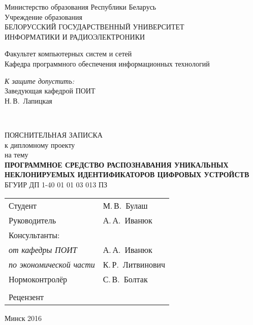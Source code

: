 \begin{titlepage}
  \begin{center}
    Министерство образования Республики Беларусь\\[1em]
    Учреждение образования\\
    БЕЛОРУССКИЙ ГОСУДАРСТВЕННЫЙ УНИВЕРСИТЕТ \\
    ИНФОРМАТИКИ И РАДИОЭЛЕКТРОНИКИ\\[1em]

    \begin{flushleft}
        Факультет компьютерных систем и сетей\\
        Кафедра программного обеспечения информационных технологий
    \end{flushleft}

    \begin{flushright}
      \begin{minipage}{0.4\textwidth}
        \textit{К защите допустить:}\\[0.8em]
        Заведующая кафедрой ПОИТ\\[0.45em]
        \underline{\hspace*{2.8cm}} Н.\,В.~Лапицкая
      \end{minipage}\\[2.2em]
    \end{flushright}

    {ПОЯСНИТЕЛЬНАЯ ЗАПИСКА}\\
    {к дипломному проекту}\\
    {на тему}\\[1em]
    \textbf{ПРОГРАММНОЕ СРЕДСТВО РАСПОЗНАВАНИЯ УНИКАЛЬНЫХ НЕКЛОНИРУЕМЫХ ИДЕНТИФИКАТОРОВ ЦИФРОВЫХ УСТРОЙСТВ}\\[1em]


    {БГУИР ДП 1-40 01 01 03 013 ПЗ}\\[2em]

    \begin{tabular}{ p{}p{} }
      Студент & М.\,В.~Булаш \\
      Руководитель & А.\,А.~Иванюк \\
      Консультанты: &\\
      \hspace*{3ex}\emph{от кафедры ПОИТ} & А.\,А.~Иванюк \\
      \hspace*{3ex}\emph{по экономической части} & К.\,Р.~Литвинович \\
      Нормоконтролёр & С.\,В.~Болтак\\
      & \\
      Рецензент &
    \end{tabular}

    \vfill
    {\normalsize Минск 2016}
  \end{center}
\end{titlepage}
